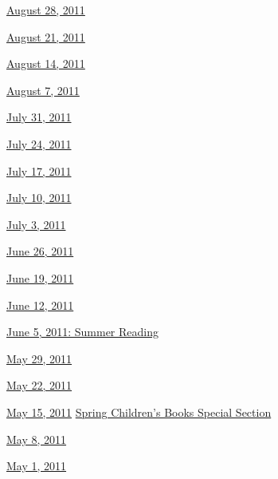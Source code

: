 \href{http://www.nytimes3xbfgragh.onion/indexes/2011/08/26/books/review/index.html}{August
28, 2011}

\href{http://www.nytimes3xbfgragh.onion/indexes/2011/08/19/books/review/index.html}{August
21, 2011}

\href{http://www.nytimes3xbfgragh.onion/indexes/2011/08/13/books/review/index.html}{August
14, 2011}

\href{http://www.nytimes3xbfgragh.onion/indexes/2011/08/07/books/review/index.html}{August
7, 2011}

\href{http://www.nytimes3xbfgragh.onion/indexes/2011/07/30/books/review/index.html}{July
31, 2011}

\href{http://www.nytimes3xbfgragh.onion/indexes/2011/07/23/books/review/index.html}{July
24, 2011}

\href{http://www.nytimes3xbfgragh.onion/indexes/2011/07/16/books/review/index.html}{July
17, 2011}

\href{http://www.nytimes3xbfgragh.onion/indexes/2011/07/09/books/review/index.html}{July
10, 2011}

\href{http://www.nytimes3xbfgragh.onion/indexes/2011/07/02/books/review/index.html}{July
3, 2011}

\href{http://www.nytimes3xbfgragh.onion/indexes/2011/06/25/books/review/index.html}{June
26, 2011}

\href{http://www.nytimes3xbfgragh.onion/indexes/2011/06/18/books/review/index.html}{June
19, 2011}

\href{http://www.nytimes3xbfgragh.onion/indexes/2011/06/11/books/review/index.html}{June
12, 2011}

\href{http://www.nytimes3xbfgragh.onion/indexes/2011/06/04/books/review/index.html}{June
5, 2011: Summer Reading}

\href{http://www.nytimes3xbfgragh.onion/indexes/2011/05/28/books/review/index.html}{May
29, 2011}

\href{http://www.nytimes3xbfgragh.onion/indexes/2011/05/21/books/review/index.html}{May
22, 2011}

\href{http://www.nytimes3xbfgragh.onion/indexes/2011/05/14/books/review/index.html}{May
15, 2011} \textbar{}
\href{http://www.nytimes3xbfgragh.onion/indexes/2011/05/13/arts/artsspecial/index.html}{Spring
Children's Books Special Section}

\href{http://www.nytimes3xbfgragh.onion/indexes/2011/05/07/books/review/index.html}{May
8, 2011}

\href{http://www.nytimes3xbfgragh.onion/indexes/2011/04/30/books/review/index.html}{May
1, 2011}

